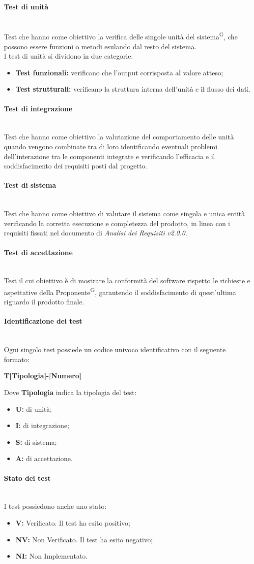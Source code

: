 \documentclass[8pt]{article}
\newcommand{\glossterm}[1]{#1\textsuperscript{G}} %
\newcommand{\subsubsubsection}[1]{\paragraph{#1}\mbox{}\\}
\begin{document}
\subsubsubsection{Test di unità}
Test che hanno come obiettivo la verifica delle singole unità del \glossterm{sistema}, che possono essere funzioni o metodi esulando dal resto del sistema. \\
I test di unità si dividono in due categorie:
\begin{itemize}
    \item \textbf{Test funzionali:} verificano che l'output corrisposta al valore atteso;
    \item \textbf{Test strutturali:} verificano la struttura interna dell'unità e il flusso dei dati.
\end{itemize}

\subsubsubsection{Test di integrazione}
Test che hanno come obiettivo la valutazione del comportamento delle unità quando vengono combinate tra di loro identificando eventuali problemi dell'interazione tra le componenti integrate e verificando l'efficacia e il soddisfacimento dei requisiti posti dal progetto.

\subsubsubsection{Test di sistema}
Test che hanno come obiettivo di valutare il sistema come singola e unica entità verificando la corretta esecuzione e completezza del prodotto, in linea con i requisiti fissati nel documento di \textit{Analisi dei Requisiti v2.0.0}.

\subsubsubsection{Test di accettazione}
Test il cui obiettivo è di mostrare la conformità del software rispetto le richieste e aspettative della \glossterm{Proponente}, garantendo il soddisfacimento di quest'ultima riguardo il prodotto finale.

\subsubsubsection{Identificazione dei test}
Ogni singolo test possiede un codice univoco identificativo con il seguente formato:
\begin{center}
	\textbf{T[Tipologia]-[Numero]}
\end{center}
Dove \textbf{Tipologia} indica la tipologia del test: 
\begin{itemize}
    \item \textbf{U:} di unità;
	\item \textbf{I:} di integrazione;
	\item \textbf{S:} di sistema;
	\item \textbf{A:} di accettazione.
\end{itemize}

\subsubsubsection{Stato dei test}
I test possiedono anche uno stato:
\begin{itemize}
	\item \textbf{V:} Verificato. Il test ha esito positivo;
	\item \textbf{NV:} Non Verificato. Il test ha esito negativo; 
	\item \textbf{NI:} Non Implementato.
\end{itemize}
\end{document}
